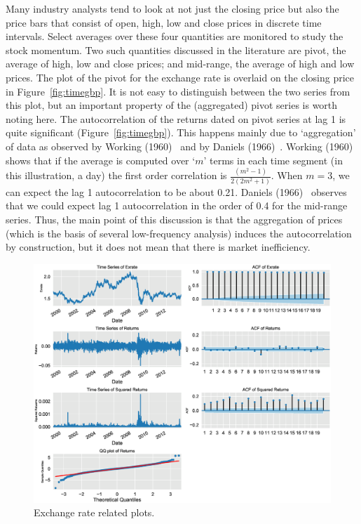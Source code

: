 Many industry analysts tend to look at not just the closing price but also the price bars that consist of open, high, low and close prices in discrete time intervals. Select averages over these four quantities are monitored to study the stock momentum. Two such quantities discussed in the literature are pivot, the average of high, low and close prices; and mid-range, the average of high and low prices. The plot of the pivot for the exchange rate is overlaid on the closing price in Figure~\ref{fig:timegbp}. It is not easy to distinguish between the two series from this plot, but an important property of the (aggregated) pivot series is worth noting here. The autocorrelation of the returns dated on pivot series at lag 1 is quite significant (Figure~\ref{fig:timegbp}). This happens mainly due to `aggregation' of data as observed by Working (1960)~\cite{working1960note} and by Daniels (1966)~\cite{daniels1966autocorrelation}. Working (1960)~\cite{working1960note} shows that if the average is computed over `$m$' terms in each time segment (in this illustration, a day) the first order correlation is $\frac{(m^2-1)}{2(2m^2+1)}$. When $m= 3$, we can expect the lag 1 autocorrelation to be about 0.21. Daniels (1966)~\cite{daniels1966autocorrelation} observes that we could expect lag 1 autocorrelation in the order of 0.4 for the mid-range series. Thus, the main point of this discussion is that the aggregation of prices (which is the basis of several low-frequency analysis) induces the autocorrelation by construction, but it does not mean that there is market inefficiency.
	\begin{figure}[!ht]
	\centering
	\includegraphics[width=\textwidth]{chapters/chapter_uvts/figures/31graphs.eps}
	\caption{Exchange rate related plots. \label{fig:exchrate}}
	\end{figure}

